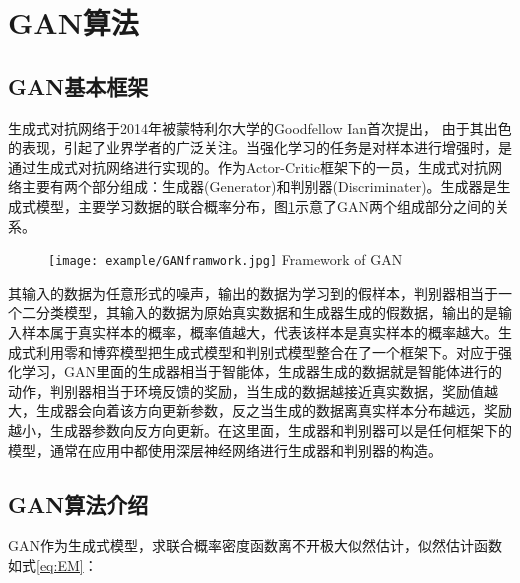 \section{GAN算法}
\subsection{GAN基本框架}
生成式对抗网络于2014年被蒙特利尔大学的Goodfellow Ian首次提出， 由于其出色的表现，引起了业界学者的广泛关注。当强化学习的任务是对样本进行增强时，是通过生成式对抗网络进行实现的。作为Actor-Critic框架下的一员，生成式对抗网络主要有两个部分组成：生成器(Generator)和判别器(Discriminater)。生成器是生成式模型，主要学习数据的联合概率分布，图\ref{fig:GAN2}示意了GAN两个组成部分之间的关系。

\begin{figure}[htbp]
	\centering
	\texttt{[image: example/GANframwork.jpg]}
	{Framework of GAN}
	\label{fig:GAN2}
\end{figure}
其输入的数据为任意形式的噪声，输出的数据为学习到的假样本，判别器相当于一个二分类模型，其输入的数据为原始真实数据和生成器生成的假数据，输出的是输入样本属于真实样本的概率，概率值越大，代表该样本是真实样本的概率越大。生成式利用零和博弈模型把生成式模型和判别式模型整合在了一个框架下。对应于强化学习，GAN里面的生成器相当于智能体，生成器生成的数据就是智能体进行的动作，判别器相当于环境反馈的奖励，当生成的数据越接近真实数据，奖励值越大，生成器会向着该方向更新参数，反之当生成的数据离真实样本分布越远，奖励越小，生成器参数向反方向更新。在这里面，生成器和判别器可以是任何框架下的模型，通常在应用中都使用深层神经网络进行生成器和判别器的构造。

\subsection{GAN算法介绍}
GAN作为生成式模型，求联合概率密度函数离不开极大似然估计，似然估计函数如式\ref{eq:EM}：

